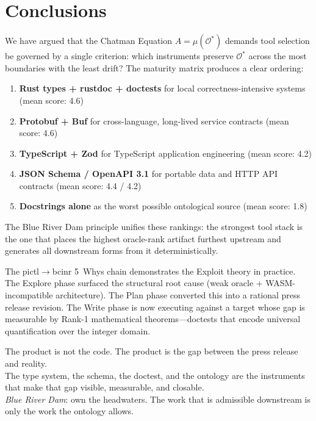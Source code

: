 \documentclass[11pt,a4paper]{article}
\theoremstyle{definition}
\begin{document}
\section{Conclusions}

We have argued that the Chatman Equation $A = \mu(\mathcal{O}^*)$ demands tool selection be governed by a single criterion: which instruments preserve $\mathcal{O}^*$ across the most boundaries with the least drift? The maturity matrix produces a clear ordering:

\begin{enumerate}
\item \textbf{Rust types + rustdoc + doctests} for local correctness-intensive systems (mean score: 4.6)
\item \textbf{Protobuf + Buf} for cross-language, long-lived service contracts (mean score: 4.6)
\item \textbf{TypeScript + Zod} for TypeScript application engineering (mean score: 4.2)
\item \textbf{JSON Schema / OpenAPI 3.1} for portable data and HTTP API contracts (mean score: 4.4 / 4.2)
\item \textbf{Docstrings alone} as the worst possible ontological source (mean score: 1.8)
\end{enumerate}

The Blue River Dam principle unifies these rankings: the strongest tool stack is the one that places the highest oracle-rank artifact furthest upstream and generates all downstream forms from it deterministically.

The pictl$\to$bcinr 5~Whys chain demonstrates the Exploit theory in practice. The Explore phase surfaced the structural root cause (weak oracle + WASM-incompatible architecture). The Plan phase converted this into a rational press release revision. The Write phase is now executing against a target whose gap is measurable by Rank-1 mathematical theorems---doctests that encode universal quantification over the integer domain.

\begin{rulebox}
The product is not the code. The product is the gap between the press release and reality.\\[4pt]
The type system, the schema, the doctest, and the ontology are the instruments that make that gap visible, measurable, and closable.\\[4pt]
\textit{Blue River Dam}: own the headwaters. The work that is admissible downstream is only the work the ontology allows.
\end{rulebox}
\end{document}
